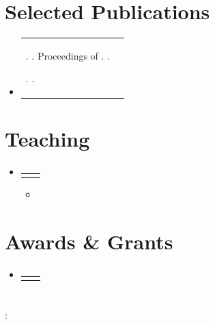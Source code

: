 \documentclass[letterpaper,11pt]{article}
\makeatletter
\newcommand{\resumeItem}[1]{
  \item\small{
    {#1 \vspace{-2pt}}
  }
}
\newcommand{\resumeProjectHeading}[2]{
    \item
    \begin{tabularx}{0.97\textwidth}{>{\raggedright\arraybackslash}X@{\hspace{1em}}r}
      \small#1 & #2 \\
    \end{tabularx}\vspace{-7pt}
}
\newcommand{\resumeSubHeadingListStart}{\begin{itemize}[leftmargin=0.15in, label={}]}
\newcommand{\resumeSubHeadingListEnd}{\end{itemize}}
\newcommand{\resumeItemListStart}{\begin{itemize}}
\newcommand{\resumeItemListEnd}{\end{itemize}\vspace{-5pt}}
\makeatother
\begin{document}
\section{Selected Publications}
  \resumeSubHeadingListStart
{}
    \resumeProjectHeading
      {\jvar{ p.authors } \newline \jvar{ p.title }. \newline
\jblock{ if p.venue_type == 'journal' }
       \emph{\jvar{ p.venue }}.
\jblock{ elif p.venue_type == 'proceedings' }
       Proceedings of \emph{\jvar{ p.venue }}.\jblock{ if p.address } \jvar{ p.address }.\jblock{ endif }

\jblock{ else }
       \emph{\jvar{ p.venue }}.\jblock{ if p.publisher } \jvar{ p.publisher }.\jblock{ endif }

\jblock{ endif }
\jblock{ if p.note }
       \newline \textbf{\jvar{ p.note }}
\jblock{ endif }
      }{\jvar{ p.year }}
  \resumeSubHeadingListEnd

\section{Teaching}
  \resumeSubHeadingListStart
{}
    \resumeProjectHeading
      {\textbf{\jvar{ t.title }}}{\jvar{ t.year }}
      \resumeItemListStart
{}
        \resumeItem{}
      \resumeItemListEnd
{}
  \resumeSubHeadingListEnd

\section{Awards \& Grants}
  \resumeSubHeadingListStart
{}
    \resumeProjectHeading
      {\jvar{ a.title }\jblock{ if a.project } \newline \textit{\jvar{ a.project }}\jblock{ endif }}{\jvar{ a.year }}
  \resumeSubHeadingListEnd

\section{}
 \begin{itemize}[leftmargin=0.15in, label={}]
    \small{\item{
     \textbf{}{: } \\

    }}
 \end{itemize}

\end{document}
